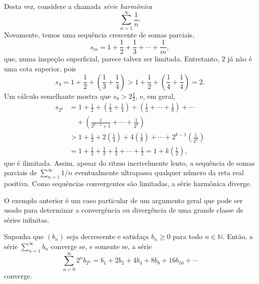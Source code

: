 \begin{example}\label{exmpl:2-4-5}
Desta vez, considere a chamada \textit{série harmônica}
\[
\sum_{n=1}^{\infty}\frac1n.
\]
Novamente, temos uma sequência crescente de somas parciais,
\[
s_m=1+\frac12+\frac13+\cdots+\frac1m,
\]
que, numa inspeção superficial, parece talvez ser limitada. Entretanto, $2$ já não é uma cota superior, pois
\[
s_4=1+\frac12+\left(\frac13+\frac14\right)>1+\frac12+\left(\frac14+\frac14\right)=2.
\]
Um cálculo semelhante mostra que $s_8>2\frac12$, e, em geral,
\[
\begin{aligned}
s_{2^k}&=1+\frac12+\left(\frac13+\frac14\right)+\left(\frac15+\cdots+\frac18\right)+\cdots\\
&\quad+\left(\frac{1}{2^{k-1}+1}+\cdots+\frac{1}{2^k}\right)\\
&>1+\frac12+2\left(\frac14\right)+4\left(\frac18\right)+\cdots+2^{k-1}\left(\frac{1}{2^k}\right)\\
&=1+\frac12+\frac12+\frac12+\cdots+\frac12=1+k\left(\frac12\right),
\end{aligned}
\]
que é ilimitada. Assim, apesar do ritmo incrivelmente lento, a sequência de somas parciais de $\sum_{n=1}^{\infty}1/n$ eventualmente ultrapassa qualquer número da reta real positiva. Como sequências convergentes são limitadas, a série harmônica diverge. 
\end{example}

O exemplo anterior é um caso particular de um argumento geral que pode ser usado para determinar a convergência ou divergência de uma grande classe de séries infinitas.

\begin{theorem}\label{thm:condensacao-cauchy}
Suponha que $(b_n)$ seja decrescente e satisfaça $b_n\geq0$ para todo $n\in\mathbb{N}$. Então, a série $\sum_{n=1}^{\infty}b_n$ converge se, e somente se, a série
\[
\sum_{n=0}^{\infty}2^n b_{2^n}=b_1+2b_2+4b_4+8b_8+16b_{16}+\cdots
\]
converge.
\end{theorem}


